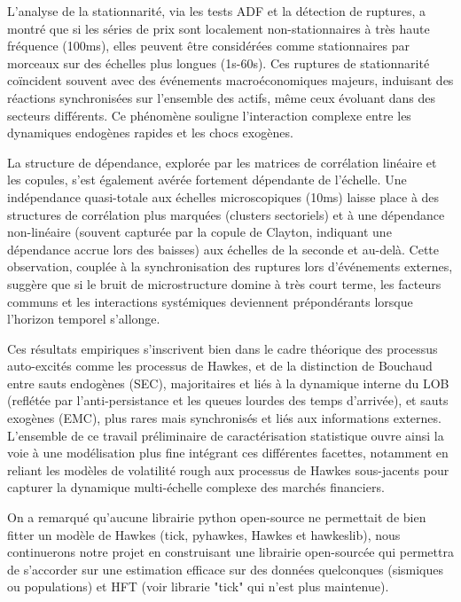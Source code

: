 \documentclass[10pt,a4paper]{article}
\theoremstyle{definition}
\theoremstyle{remark}
\begin{document}
\begin{itemize}
    L'analyse de la stationnarité, via les tests ADF et la détection de ruptures, a montré que si les séries de prix sont localement non-stationnaires à très haute fréquence (100ms), elles peuvent être considérées comme stationnaires par morceaux sur des échelles plus longues (1s-60s). Ces ruptures de stationnarité coïncident souvent avec des événements macroéconomiques majeurs, induisant des réactions synchronisées sur l'ensemble des actifs, même ceux évoluant dans des secteurs différents. Ce phénomène souligne l'interaction complexe entre les dynamiques endogènes rapides et les chocs exogènes.

    La structure de dépendance, explorée par les matrices de corrélation linéaire et les copules, s'est également avérée fortement dépendante de l'échelle. Une indépendance quasi-totale aux échelles microscopiques (10ms) laisse place à des structures de corrélation plus marquées (clusters sectoriels) et à une dépendance non-linéaire (souvent capturée par la copule de Clayton, indiquant une dépendance accrue lors des baisses) aux échelles de la seconde et au-delà. Cette observation, couplée à la synchronisation des ruptures lors d'événements externes, suggère que si le bruit de microstructure domine à très court terme, les facteurs communs et les interactions systémiques deviennent prépondérants lorsque l'horizon temporel s'allonge.

    Ces résultats empiriques s'inscrivent bien dans le cadre théorique des processus auto-excités comme les processus de Hawkes, et de la distinction de Bouchaud entre sauts endogènes (SEC), majoritaires et liés à la dynamique interne du LOB (reflétée par l'anti-persistance et les queues lourdes des temps d'arrivée), et sauts exogènes (EMC), plus rares mais synchronisés et liés aux informations externes. L'ensemble de ce travail préliminaire de caractérisation statistique ouvre ainsi la voie à une modélisation plus fine intégrant ces différentes facettes, notamment en reliant les modèles de volatilité rough aux processus de Hawkes sous-jacents pour capturer la dynamique multi-échelle complexe des marchés financiers.

    On a remarqué qu'aucune librairie python open-source ne permettait de bien fitter un modèle de Hawkes (tick, pyhawkes, Hawkes et hawkeslib), nous continuerons notre projet en construisant une librairie open-sourcée qui permettra de s'accorder sur une estimation efficace sur des données quelconques (sismiques ou populations) et HFT (voir librarie "tick" qui n'est plus maintenue).
\newpage
\begin{thebibliography}{9}


\end{thebibliography}
\end{itemize}
\end{document}
